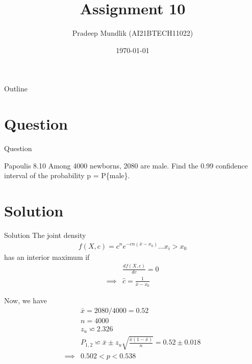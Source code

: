 \documentclass{beamer}
\title{Assignment 10}
\author{Pradeep Mundlik (AI21BTECH11022)}
\date{\today}
\begin{document}
\begin{frame}
    \titlepage 
\end{frame}



\begin{frame}{Outline}
    \tableofcontents
\end{frame}


\section{Question}
\begin{frame}{Question}
    \begin{block}{Papoulis 8.10}
        Among 4000 newborns, 2080 are male. Find the 0.99 confidence interval of the probability p = P\{male\}.
    \end{block}
\end{frame}

\section{Solution}
\begin{frame}{Solution}
    The joint density
    \begin{align}
        f(X,c) = c^n e^{-cn\left(\bar{x} - x_0 \right)} \dots x_i > x_0
    \end{align}
    has an interior maximum if 
    \begin{align}
        &\frac{df(X,c)}{dc} = 0 \\
        \implies &\hat{c} = \frac{1}{\bar{x} - x_0} 
    \end{align}
\end{frame}

\begin{frame}
    Now, we have 
    \begin{align}
        &\bar{x} = 2080/4000 = 0.52 \\
        &n = 4000 \\
        &z_u \backsimeq 2.326 \\
        &P_{1,2} \backsimeq \bar{x} \pm z_u \sqrt{\frac{\bar{x}\left(1 - \bar{x}\right)}{n}} = 0.52 \pm 0.018 \\
        \implies &0.502 < p < 0.538 
    \end{align}
\end{frame}
\end{document}
